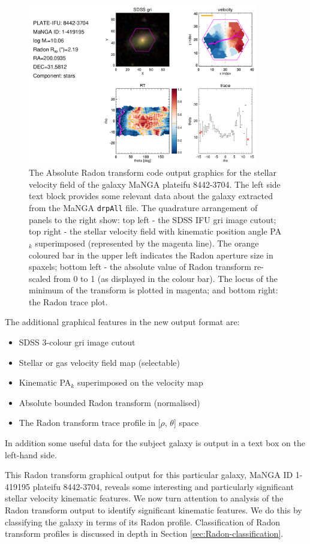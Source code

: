 \begin{figure}
    \centering
    \includegraphics[width=0.9\textwidth]{images/RadonPlots/RT-SNIPS-NEW/8442-3704-complete.png}
    \caption[Radon transform code output graphics for stellar velocity field of the MaNGA plateifu 8442-3704]{The Absolute Radon transform code output graphics for the stellar velocity field of the galaxy MaNGA plateifu 8442-3704. The left side text block provides some relevant data about the galaxy extracted from the MaNGA \texttt{drpAll} file. The quadrature arrangement of panels to the right show: top left - the SDSS IFU gri image cutout; top right - the stellar velocity field with kinematic position angle PA$_{k}$ superimposed (represented by the magenta line). The orange coloured  bar in the upper left indicates the Radon aperture size in spaxels; bottom left - the absolute value of Radon transform re-scaled from 0 to 1 (as displayed in the colour bar). The locus of the minimum of the transform is plotted in magenta; and bottom right: the Radon trace plot.}
    \label{fig:8442-3704-complete}
\end{figure}

The additional graphical features in the new output format are:
\begin{itemize}
\item SDSS 3-colour gri image cutout
\item Stellar or gas velocity field map (selectable)
\item Kinematic PA$_{k}$ superimposed on the velocity map
\item Absolute bounded Radon transform (normalised)
\item The Radon transform trace profile in [$\rho$,	$\theta$] space
\end{itemize}
In addition some useful data for the subject galaxy is output in a text box on the left-hand side.

This Radon transform graphical output for this particular galaxy, MaNGA ID 1-419195 plateifu 8442-3704, reveals some interesting and particularly significant stellar velocity kinematic features. We now turn attention to analysis of the Radon transform output to identify significant kinematic features. We do this by classifying the galaxy in terms of its Radon profile. Classification of Radon transform profiles is discussed in depth in Section \ref{sec:Radon-classification}. 






